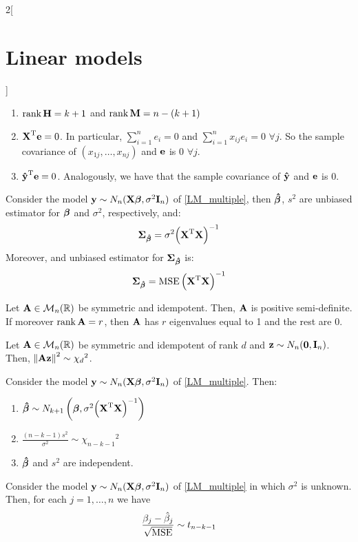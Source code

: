 \documentclass[../../../main_math.tex]{subfiles}
\begin{document}
\begin{multicols}{2}[\section{Linear models}]
\begin{proposition}
\begin{enumerate}
      \item $\rank \boldsymbol{\mathrm{H}}=k+1$ and $\rank \boldsymbol{\mathrm{M}}=n-(k+1)$
      \item ${\boldsymbol{\mathrm{X}}}^{\mathrm{T}}\boldsymbol{\mathrm{e}}=0$. In particular, $\sum_{i=1}^n e_i=0$ and $\sum_{i=1}^n x_{ij}e_i=0$ $\forall j$. So the sample covariance of $(x_{1j},\ldots,x_{nj})$ and $\boldsymbol{\mathrm{e}}$ is 0 $\forall j$.
      \item ${\boldsymbol{\mathrm{\hat{y}}}}^{\mathrm{T}}\boldsymbol{\mathrm{e}}=0$. Analogously, we have that the sample covariance of $\boldsymbol{\mathrm{\hat{y}}}$ and $\boldsymbol{\mathrm{e}}$ is 0.
    \end{enumerate}
  \end{proposition}
  \begin{proposition}
    Consider the model $\boldsymbol{\mathrm{y}}\sim N_n(\boldsymbol{\mathrm{X\beta}},\sigma^2\boldsymbol{\mathrm{I}}_n)$ of \cref{LM_multiple}, then $\boldsymbol{\mathrm{\hat\beta}}$, $s^2$ are unbiased estimator for $\boldsymbol{\mathrm{\beta}}$ and $\sigma^2$, respectively, and: $$\boldsymbol{\mathrm{\Sigma}}_{\boldsymbol{\mathrm{\hat\beta}}}=\sigma^2{\left({\boldsymbol{\mathrm{X}}}^{\mathrm{T}}\boldsymbol{\mathrm{X}}\right)}^{-1}$$
    Moreover, and unbiased estimator for $\boldsymbol{\mathrm{\Sigma}}_{\boldsymbol{\mathrm{\hat\beta}}}$ is: $$\boldsymbol{\mathrm{\Sigma}}_{\boldsymbol{\mathrm{\hat\beta}}}=\operatorname{MSE}{\left({\boldsymbol{\mathrm{X}}}^{\mathrm{T}}\boldsymbol{\mathrm{X}}\right)}^{-1}$$
  \end{proposition}
  \begin{proposition}
    Let $\boldsymbol{\mathrm{A}}\in\mathcal{M}_n(\mathbb{R})$ be symmetric and idempotent. Then, $\boldsymbol{\mathrm{A}}$ is positive semi-definite. If moreover $\rank\boldsymbol{\mathrm{A}} =r$, then $\boldsymbol{\mathrm{A}}$ has $r$ eigenvalues equal to 1 and the rest are 0.
  \end{proposition}
  \begin{lemma}
    Let $\boldsymbol{\mathrm{A}}\in\mathcal{M}_n(\mathbb{R})$ be symmetric and idempotent of rank $d$ and $\boldsymbol{\mathrm{z}}\sim N_n(\boldsymbol{\mathrm{0}},\boldsymbol{\mathrm{I}}_n)$. Then, $\left\|\boldsymbol{\mathrm{Az}}\right\|^2\sim{\chi_d}^2$.
  \end{lemma}
  \begin{proposition}
    Consider the model $\boldsymbol{\mathrm{y}}\sim N_n(\boldsymbol{\mathrm{X\beta}},\sigma^2\boldsymbol{\mathrm{I}}_n)$ of \cref{LM_multiple}. Then:
    \begin{enumerate}
      \item $\boldsymbol{\mathrm{\hat\beta}}\sim N_{k+1}\left(\boldsymbol{\mathrm{\beta}},\sigma^2{\left({\boldsymbol{\mathrm{X}}}^{\mathrm{T}}\boldsymbol{\mathrm{X}}\right)}^{-1}\right)$
      \item $\frac{(n-k-1)s^2}{\sigma^2}\sim{\chi_{n-k-1}}^2$
      \item $\boldsymbol{\mathrm{\hat\beta}}$ and $s^2$ are independent.
    \end{enumerate}
  \end{proposition}
  \begin{proposition}
    Consider the model $\boldsymbol{\mathrm{y}}\sim N_n(\boldsymbol{\mathrm{X\beta}},\sigma^2\boldsymbol{\mathrm{I}}_n)$ of \cref{LM_multiple} in which $\sigma^2$ is unknown. Then, for each $j=1,\ldots,n$ we have $$\frac{\beta_j-\hat\beta_j}{\sqrt{\operatorname{MSE}}}\sim t_{n-k-1}$$

\end{proposition}
\end{multicols}
\end{document}
